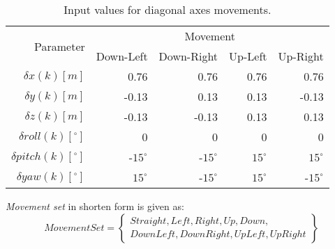 \begin{table}[H]
    \centering
    \begin{tabular}{r||r|r|r|r}
    	\multirow{2}{*}{Parameter} & \multicolumn{4}{c}{Movement} \\\cline{2-5} 
                    & Down-Left & Down-Right & Up-Left  & Up-Right   \\\hline\hline
        $\delta     x(k)[m]$           & 0.76  & 0.76  & 0.76 & 0.76  \\\hline
        $\delta     y(k)[m]$           & -0.13	& 0.13	& 0.13 & -0.13 \\\hline
        $\delta     z(k)[m]$           & -0.13 & -0.13 & 0.13 & 0.13  \\\hline
        $\delta  roll(k) [^\circ]$	& 0	    & 0	    & 0    & 0     \\\hline
        $\delta pitch(k) [^\circ]$     & -$15^\circ$ & -$15^\circ$ & $15^\circ$ & $15^\circ$     \\\hline
        $\delta   yaw(k) [^\circ]$    & $15^\circ$	& -$15^\circ$	& $15^\circ$ & -$15^\circ$ \\
    \end{tabular}
    \caption{Input values for diagonal axes movements.}
    \label{tab:movements2}
\end{table}

\begin{note}
    \emph{Movement set} in shorten form is given as:
    \begin{equation}\label{eq:OurMovementSet}
        Movement Set= \left\{
        \begin{gathered}
            Straight, Left,Right, Up, Down,\\
            Down Left, Down Right,  Up Left,   Up Right
        \end{gathered}
        \right\}
    \end{equation}
\end{note}

